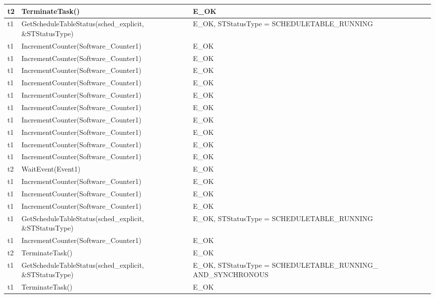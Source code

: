 \documentclass[10pt]{article}
\newlength{\Li}\settowidth{\Li}{Running}
\newlength{\Lii}\setlength{\Lii}{7cm}
\newlength{\Liiii}\setlength{\Liiii}{0.9cm}
\newlength{\Liii}\setlength{\Liii}{\textwidth} \addtolength{\Liii}{-\Li} \addtolength{\Liii}{-\Lii} \addtolength{\Liii}{-\Liiii}
\begin{document}
\begin{supertabular}{|p{\Li}|p{\Lii}|p{\Liii}|p{\Liiii}|}
	t2		& TerminateTask()											& E\_OK																	& \\ \hline
	t1		& GetScheduleTableStatus(sched\_explicit, \&STStatusType)			& E\_OK, STStatusType = SCHEDULETABLE\_RUNNING 							& \\ \hline
	t1		& IncrementCounter(Software\_Counter1)						& E\_OK																	& \\ \hline
	t1		& IncrementCounter(Software\_Counter1)						& E\_OK																	& \\ \hline
	t1		& IncrementCounter(Software\_Counter1)						& E\_OK																	& \\ \hline
	t1		& IncrementCounter(Software\_Counter1)						& E\_OK																	& \\ \hline
	t1		& IncrementCounter(Software\_Counter1)						& E\_OK																	& \\ \hline
	t1		& IncrementCounter(Software\_Counter1)						& E\_OK																	& \\ \hline
	t1		& IncrementCounter(Software\_Counter1)						& E\_OK																	& \\ \hline
	t1		& IncrementCounter(Software\_Counter1)						& E\_OK																	& \\ \hline
	t1		& IncrementCounter(Software\_Counter1)						& E\_OK																	& \\ \hline
	t1		& IncrementCounter(Software\_Counter1)						& E\_OK																	& \\ \hline
	t2		& WaitEvent(Event1)											& E\_OK																	& \\ \hline
	t1		& IncrementCounter(Software\_Counter1)						& E\_OK																	& \\ \hline
	t1		& IncrementCounter(Software\_Counter1)						& E\_OK																	& \\ \hline
	t1		& IncrementCounter(Software\_Counter1)						& E\_OK																	& \\ \hline
	t1		& GetScheduleTableStatus(sched\_explicit, \&STStatusType)			& E\_OK, STStatusType = SCHEDULETABLE\_RUNNING 							& \\ \hline
	t1		& IncrementCounter(Software\_Counter1)						& E\_OK																	& \\ \hline
	t2		& TerminateTask()											& E\_OK																	& \\ \hline
	t1		& GetScheduleTableStatus(sched\_explicit, \&STStatusType)			& E\_OK, STStatusType = SCHEDULETABLE\_RUNNING\_ AND\_SYNCHRONOUS		& \\ \hline
	t1		& TerminateTask()											& E\_OK																	& \\ \hline
	\end{supertabular}\\
	
\end{document}
